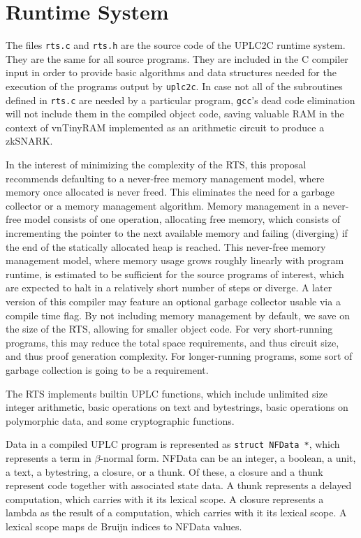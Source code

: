 \documentclass[12pt]{article}
\begin{document}
\section{Runtime System}

The files \texttt{rts.c} and \texttt{rts.h} are the source code of the UPLC2C runtime system. They are the same for all source programs. They are included in the C compiler input in order to provide basic algorithms and data structures needed for the execution of the programs output by \texttt{uplc2c}. In case not all of the subroutines defined in \texttt{rts.c} are needed by a particular program, \texttt{gcc}'s dead code elimination will not include them in the compiled object code, saving valuable RAM in the context of vnTinyRAM implemented as an arithmetic circuit to produce a zkSNARK.

In the interest of minimizing the complexity of the RTS, this proposal recommends defaulting to a never-free memory management model, where memory once allocated is never freed. This eliminates the need for a garbage collector or a memory management algorithm. Memory management in a never-free model consists of one operation, allocating free memory, which consists of incrementing the pointer to the next available memory and failing (diverging) if the end of the statically allocated heap is reached. This never-free memory management model, where memory usage grows roughly linearly with program runtime, is estimated to be sufficient for the source programs of interest, which are expected to halt in a relatively short number of steps or diverge. A later version of this compiler may feature an optional garbage collector usable via a compile time flag. By not including memory management by default, we save on the size of the RTS, allowing for smaller object code. For very short-running programs, this may reduce the total space requirements, and thus circuit size, and thus proof generation complexity. For longer-running programs, some sort of garbage collection is going to be a requirement.

The RTS implements builtin UPLC functions, which include unlimited size integer arithmetic, basic operations on text and bytestrings, basic operations on polymorphic data, and some cryptographic functions.

Data in a compiled UPLC program is represented as \texttt{struct NFData *}, which represents a term in $\beta$-normal form. NFData can be an integer, a boolean, a unit, a text, a bytestring, a closure, or a thunk. Of these, a closure and a thunk represent code together with associated state data. A thunk represents a delayed computation, which carries with it its lexical scope. A closure represents a lambda as the result of a computation, which carries with it its lexical scope. A lexical scope maps de Bruijn indices to NFData values.
\end{document}
